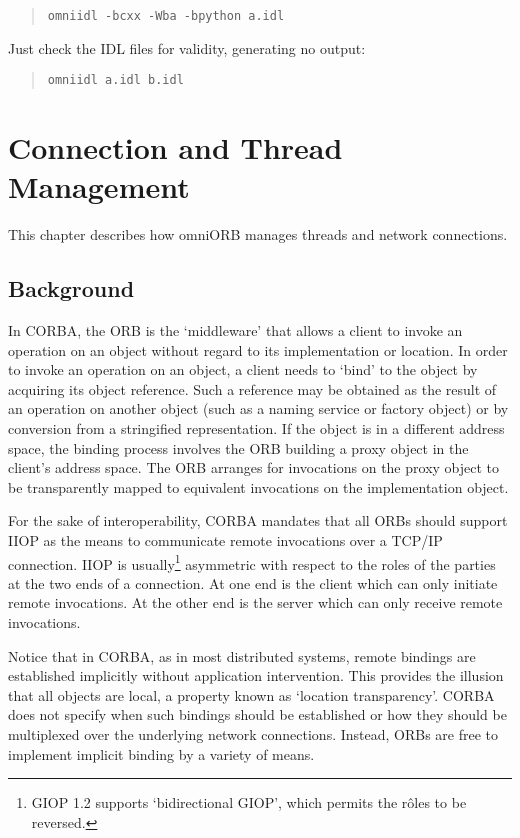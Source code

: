 \documentclass[11pt,twoside,a4paper]{book}
\newcommand{\cmdline}[1]{\texttt{#1}}
\begin{document}
\begin{quote}
\cmdline{omniidl -bcxx -Wba -bpython a.idl}
\end{quote}

\noindent Just check the IDL files for validity, generating no output:

\begin{quote}
\cmdline{omniidl a.idl b.idl}
\end{quote}




\chapter{Connection and Thread Management}
\label{chap:connections}


This chapter describes how omniORB manages threads and network
connections.

\section{Background}

In CORBA, the ORB is the `middleware' that allows a client to invoke
an operation on an object without regard to its implementation or
location. In order to invoke an operation on an object, a client needs
to `bind' to the object by acquiring its object reference. Such a
reference may be obtained as the result of an operation on another
object (such as a naming service or factory object) or by conversion
from a stringified representation. If the object is in a different
address space, the binding process involves the ORB building a proxy
object in the client's address space. The ORB arranges for invocations
on the proxy object to be transparently mapped to equivalent
invocations on the implementation object.

For the sake of interoperability, CORBA mandates that all ORBs should
support IIOP as the means to communicate remote invocations over a
TCP/IP connection. IIOP is usually\footnote{GIOP 1.2 supports
`bidirectional GIOP', which permits the r\^oles to be reversed.}
asymmetric with respect to the roles of the parties at the two ends of
a connection. At one end is the client which can only initiate remote
invocations. At the other end is the server which can only receive
remote invocations.

Notice that in CORBA, as in most distributed systems, remote bindings
are established implicitly without application intervention. This
provides the illusion that all objects are local, a property known as
`location transparency'. CORBA does not specify when such bindings
should be established or how they should be multiplexed over the
underlying network connections. Instead, ORBs are free to implement
implicit binding by a variety of means.
\end{document}
